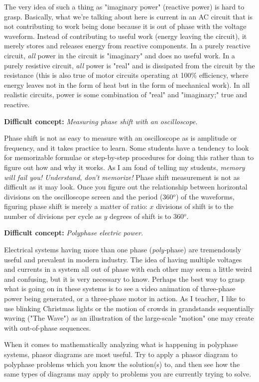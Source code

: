 The very idea of such a thing as "imaginary power" (reactive power) is hard to grasp.  Basically, what we're talking about here is current in an AC circuit that is not contributing to work being done because it is out of phase with the voltage waveform.  Instead of contributing to useful work (energy leaving the circuit), it merely stores and releases energy from reactive components.  In a purely reactive circuit, {\it all} power in the circuit is "imaginary" and does no useful work.  In a purely resistive circuit, {\it all} power is "real" and is dissipated from the circuit by the resistance (this is also true of motor circuits operating at 100\% efficiency, where energy leaves not in the form of heat but in the form of mechanical work).  In all realistic circuits, power is some combination of "real" and "imaginary;" true and reactive.

\vskip 10pt

\noindent
{\bf Difficult concept: } {\it Measuring phase shift with an oscilloscope.}

Phase shift is not as easy to measure with an oscilloscope as is amplitude or frequency, and it takes practice to learn.  Some students have a tendency to look for memorizable formulae or step-by-step procedures for doing this rather than to figure out how and why it works.  As I am fond of telling my students, {\it memory will fail you!  Understand, don't memorize!}  Phase shift measurement is not as difficult as it may look.  Once you figure out the relationship between horizontal divisions on the oscilloscope screen and the period (360$^{o}$) of the waveforms, figuring phase shift is merely a matter of ratio: $x$ divisions of shift is to the number of divisions per cycle as $y$ degrees of shift is to 360$^{o}$.

\vskip 10pt

\noindent
{\bf Difficult concept: } {\it Polyphase electric power.}

Electrical systems having more than one phase ({\it poly-}phase) are tremendously useful and prevalent in modern industry.  The idea of having multiple voltages and currents in a system all out of phase with each other may seem a little weird and confusing, but it is very necessary to know.  Perhaps the best way to grasp what is going on in these systems is to see a video animation of three-phase power being generated, or a three-phase motor in action.  As I teacher, I like to use blinking Christmas lights or the motion of crowds in grandstands sequentially waving ("The Wave") as an illustration of the large-scale "motion" one may create with out-of-phase sequences.

When it comes to mathematically analyzing what is happening in polyphase systems, phasor diagrams are most useful.  Try to apply a phasor diagram to polyphase problems which you know the solution(s) to, and then see how the same types of diagrams may apply to problems you are currently trying to solve.




